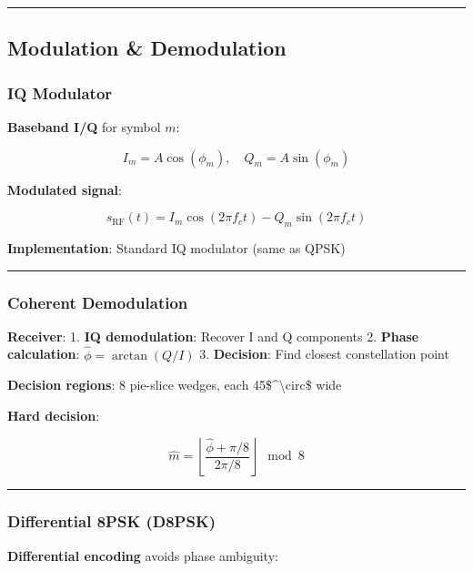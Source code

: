\begin{center}\rule{0.5\linewidth}{0.5pt}\end{center}

\subsection{Modulation \& Demodulation}\label{modulation-demodulation}

\subsubsection{IQ Modulator}\label{iq-modulator}

\textbf{Baseband I/Q} for symbol \(m\):

\[
I_m = A\cos(\phi_m), \quad Q_m = A\sin(\phi_m)
\]

\textbf{Modulated signal}:

\[
s_{\text{RF}}(t) = I_m \cos(2\pi f_c t) - Q_m \sin(2\pi f_c t)
\]

\textbf{Implementation}: Standard IQ modulator (same as QPSK)

\begin{center}\rule{0.5\linewidth}{0.5pt}\end{center}

\subsubsection{Coherent Demodulation}\label{coherent-demodulation}

\textbf{Receiver}: 1. \textbf{IQ demodulation}: Recover I and Q
components 2. \textbf{Phase calculation}: \(\hat{\phi} = \arctan(Q/I)\)
3. \textbf{Decision}: Find closest constellation point

\textbf{Decision regions}: 8 pie-slice wedges, each
45\$\^{}\textbackslash circ\$ wide

\textbf{Hard decision}:

\[
\hat{m} = \left\lfloor \frac{\hat{\phi} + \pi/8}{2\pi/8} \right\rfloor \mod 8
\]

\begin{center}\rule{0.5\linewidth}{0.5pt}\end{center}

\subsubsection{Differential 8PSK (D8PSK)}\label{differential-8psk-d8psk}

\textbf{Differential encoding} avoids phase ambiguity:

